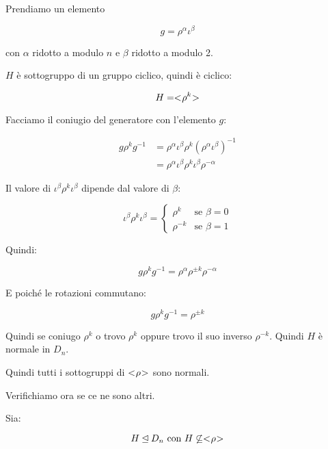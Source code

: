 	Prendiamo un elemento
	
	\begin{equation}
		g = \rho^\alpha \iota^\beta
	\end{equation}

	con $\alpha$ ridotto a modulo $n$ e $\beta$ ridotto a modulo 2.
	
	$H$ è sottogruppo di un gruppo ciclico, quindi è ciclico:
	
	\begin{equation}
		H = < \negmedspace \rho^k \negmedspace >
	\end{equation}

	Facciamo il coniugio del generatore con l'elemento $g$:
	
	\begin{align}
		g \rho^k g^{-1} 
		& = \rho^\alpha \iota^\beta \rho^k (\rho^\alpha \iota^\beta)^{-1} \\
		& = \rho^\alpha \iota^\beta \rho^k \iota^\beta \rho^{-\alpha}
	\end{align}

	Il valore di $\iota^\beta \rho^k \iota^\beta$ dipende dal valore di $\beta$:
	
	\begin{equation}
		\iota^\beta \rho^k \iota^\beta = 
		\begin{cases}
			\rho^k & \text{se } \beta = 0 \\
			\rho^{-k} & \text{se } \beta = 1
		\end{cases}
	\end{equation}

	Quindi:
	
	\begin{equation}
		g \rho^k g^{-1} = \rho^\alpha \rho^{\pm k} \rho^{-\alpha} 
	\end{equation}

	E poiché le rotazioni commutano:
	
	\begin{equation}
		g \rho^k g^{-1} = \rho^{\pm k}
	\end{equation}
	
	Quindi se coniugo $\rho^k$ o trovo $\rho^k$ oppure trovo il suo inverso $\rho^{-k}$. Quindi $H$ è normale in $D_n$.
	
	Quindi tutti i sottogruppi di $< \negmedspace \rho \negmedspace >$ sono normali.
	
	Verifichiamo ora se ce ne sono altri.
	
	Sia:
	
	\begin{equation}
		H \unlhd D_n \text{ con } H \not\subseteq < \negmedspace \rho \negmedspace >
	\end{equation}

